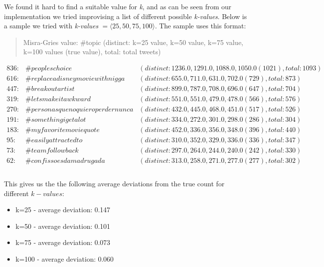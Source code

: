 We found it hard to find a suitable value for \textit{k}, and as can be seen from our implementation we tried improvising a list of different possible \textit{k-values}. Below is a sample we tried with \textit{k-values} $= \langle 25, 50, 75, 100 \rangle$. The sample uses this format:
\begin{quote}
    Misra-Gries value: \#topic (distinct: k=25 value, k=50 value, k=75 value, k=100 values (true value), total: total tweets)
\end{quote}
{\footnotesize
$\begin{array}{lll}
        836: & \#peopleschoice & (distinct: 1236.0,1291.0,1088.0,1050.0 (1021), total: 1093) \\
        616: & \#replaceadisneymoviewithnigga & (distinct: 655.0,711.0,631.0,702.0 (729), total: 873) \\
        447: & \#breakoutartist & (distinct: 899.0,787.0,708.0,696.0 (647), total: 704) \\
        319: & \#letsmakeitawkward & (distinct: 551.0,551.0,479.0,478.0 (566), total: 576) \\
        270: & \#personasquenoquieroperdernunca & (distinct: 432.0,445.0,468.0,451.0 (517), total: 526) \\
        191: & \#somethingigetalot & (distinct: 334.0,272.0,301.0,298.0 (286), total: 304) \\
        183: & \#myfavoritemoviequote & (distinct: 452.0,336.0,356.0,348.0 (396), total: 440) \\
        95: & \#easilyattractedto & (distinct: 310.0,352.0,329.0,336.0 (336), total: 347) \\
        73: & \#teamfollowback & (distinct: 297.0,264.0,244.0,240.0 (242), total: 330) \\
        62: & \#confissoesdamadrugada & (distinct: 313.0,258.0,271.0,277.0 (277), total: 302) \\
\end{array}$}
\\\\
This gives us the the following average deviations from the true count for different $k-values$:
\begin{itemize}
    \item k=25 - average deviation: 0.147
    \item k=50 - average deviation: 0.101
    \item k=75 - average deviation: 0.073
    \item k=100 - average deviation: 0.060
\end{itemize}

